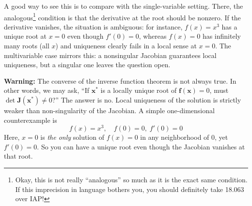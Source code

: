 A good way to see this is to compare with the single-variable setting. There, the analogous\footnote{Okay, this is not really ``analogous'' so much as it is the exact same condition. If this imprecision in language bothers you, you should definitely take 18.063 over IAP!} condition is that the derivative at the root should be nonzero. If the derivative vanishes, the situation is ambiguous: for instance, $f(x) = x^3$ has a unique root at $x=0$ even though $f'(0) = 0$, whereas $f(x) = 0$ has infinitely many roots (all $x$) and uniqueness clearly fails in a local sense at $x=0$. The multivariable case mirrors this: a nonsingular Jacobian guarantees local uniqueness, but a singular one leaves the question open.

\begin{warningBox}
    \textbf{Warning:} The converse of the inverse function theorem is not always true. In other words, we may ask, ``If $\mathbf x^*$ is a locally unique root of $\mathbf f(\mathbf x)=0$, must $\det \mathbf J(\mathbf x^*)\neq0$?'' The answer is no. Local uniqueness of the solution is strictly weaker than non-singularity of the Jacobian.  A simple one-dimensional counterexample is
    $$
      f(x) = x^3,\quad f(0)=0,\; f'(0)=0
    $$
    Here, $x=0$ is \textit{the only} solution of $f(x)=0$ in any neighborhood of 0, yet $f'(0)=0$.  So you can have a unique root even though the Jacobian vanishes at that root.
\end{warningBox}







